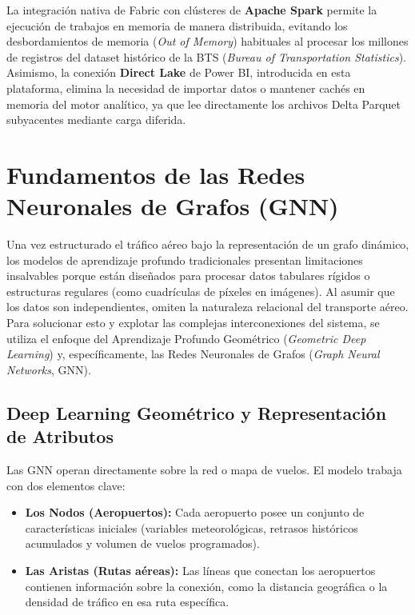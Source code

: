 \documentclass[12pt,oneside,a4paper]{report}
\renewcommand{\_}{\textunderscore\allowbreak}
\begin{document}
La integración nativa de Fabric con clústeres de \textbf{Apache Spark} permite la ejecución de trabajos en memoria de manera distribuida, evitando los desbordamientos de memoria (\textit{Out of Memory}) habituales al procesar los millones de registros del dataset histórico de la BTS (\textit{Bureau of Transportation Statistics}). Asimismo, la conexión \textbf{Direct Lake} de Power BI, introducida en esta plataforma, elimina la necesidad de importar datos o mantener cachés en memoria del motor analítico, ya que lee directamente los archivos Delta Parquet subyacentes mediante carga diferida.

\section{Fundamentos de las Redes Neuronales de Grafos (GNN)}
\label{sec:fundamentos_gnn}

Una vez estructurado el tráfico aéreo bajo la representación de un grafo dinámico, los modelos de aprendizaje profundo tradicionales presentan limitaciones insalvables porque están diseñados para procesar datos tabulares rígidos o estructuras regulares (como cuadrículas de píxeles en imágenes). Al asumir que los datos son independientes, omiten la naturaleza relacional del transporte aéreo. Para solucionar esto y explotar las complejas interconexiones del sistema, se utiliza el enfoque del Aprendizaje Profundo Geométrico (\textit{Geometric Deep Learning}) y, específicamente, las Redes Neuronales de Grafos (\textit{Graph Neural Networks}, GNN).

\subsection{Deep Learning Geométrico y Representación de Atributos}
\label{sub:geometric_dl}

Las GNN operan directamente sobre la red o mapa de vuelos. El modelo trabaja con dos elementos clave:

\begin{itemize}
    \item \textbf{Los Nodos (Aeropuertos):} Cada aeropuerto posee un conjunto de características iniciales (variables meteorológicas, retrasos históricos acumulados y volumen de vuelos programados).
    \item \textbf{Las Aristas (Rutas aéreas):} Las líneas que conectan los aeropuertos contienen información sobre la conexión, como la distancia geográfica o la densidad de tráfico en esa ruta específica.
\end{itemize}
\end{document}
